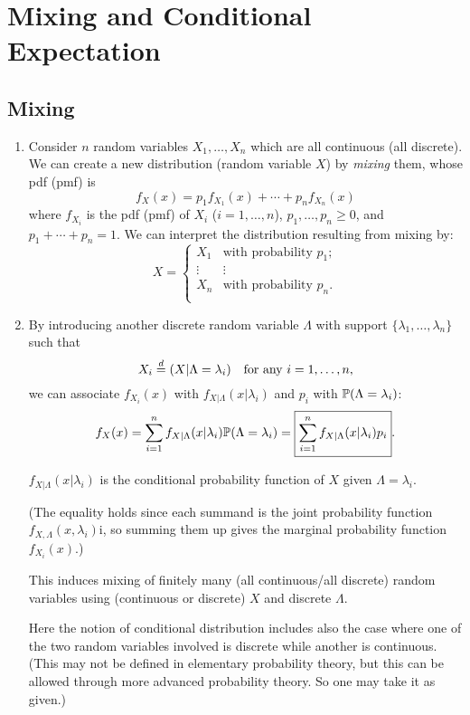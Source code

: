 \section{Mixing and Conditional Expectation}
\label{sect:mixing-and-ce}
\subsection{Mixing}
\begin{enumerate}
\item Consider \(n\) random variables \(X_1,\dotsc,X_n\) which are all continuous
(all discrete). We can create a new distribution (random variable \(X\)) by
\emph{mixing} them, whose pdf (pmf) is
\[
f_X(x)=p_1f_{X_1}(x)+\dotsb+p_nf_{X_n}(x)
\]
where \(f_{X_i}\) is the pdf (pmf) of \(X_i\) (\(i=1,\dotsc,n\)),
\(p_1,\dotsc,p_n\ge 0\), and \(p_1+\dotsb+p_n=1\). We can interpret the
distribution resulting from mixing by:
\[
X=\begin{cases}
X_1&\text{with probability \(p_1\)};\\
\vdots&\vdots\\
X_n&\text{with probability \(p_n\)}.\\
\end{cases}
\]
\item \label{it:mixing-finite}
By introducing another discrete random variable \(\Lambda\) with support
\(\{\lambda_1,\dotsc,\lambda_n\}\) such that
\[
X_i\overset{d}= (X|\Lambda=\lambda_i)\quad\text{for any \(i=1,\dotsc,n\)},
\]
we can associate \(f_{X_i}(x)\) with \(f_{X|\Lambda}(x|\lambda_i)\) and \(p_i\)
with \(\mathbb{P}\qty(\Lambda=\lambda_i)\):
\[
f_X(x)=\sum_{i=1}^{n}f_{X|\Lambda}(x|\lambda_i)\mathbb{P}\qty(\Lambda=\lambda_i)
=\boxed{\sum_{i=1}^{n}f_{X|\Lambda}(x|\lambda_i)p_i}.
\]
\begin{note}
\(f_{X|\Lambda}(x|\lambda_i)\) is the conditional probability function of \(X\)
given \(\Lambda=\lambda_i\).
\end{note}

(The equality holds since each summand is the joint probability function
\(f_{X,\Lambda}(x,\lambda_i)\)i, so summing them up gives the marginal
probability function \(f_{X_i}(x)\).)

This induces mixing of finitely many (all continuous/all discrete) random
variables using (continuous or discrete) \(X\) and discrete \(\Lambda\).

\begin{note}
Here the notion of conditional distribution includes also the case
where one of the two random variables involved is discrete while another is
continuous. (This may not be defined in elementary probability theory, but this
can be allowed through more advanced probability theory. So one may take it as
given.)
\end{note}


\end{enumerate}

